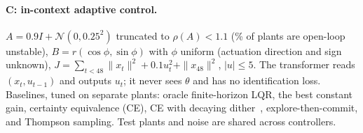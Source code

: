 \paragraph{C: in-context adaptive control.} $A=0.9I+\mathcal{N}(0,0.25^2)$ truncated to $\rho(A)<1.1$ (\CfracUnst\% of
plants are open-loop unstable), $B=r(\cos\phi,\sin\phi)$ with $\phi$ uniform (actuation direction and sign unknown),
$J=\sum_{t<48}\|x_t\|^2+0.1u_t^2+\|x_{48}\|^2$, $|u|\le5$. The transformer reads $(x_t,u_{t-1})$ and outputs $u_t$; it
never sees $\theta$ and has no identification loss. Baselines, tuned on separate plants: oracle finite-horizon LQR, the best
constant gain, certainty equivalence (CE), CE with decaying dither~\citep{simchowitz2020naive}, explore-then-commit, and
Thompson sampling. Test plants and noise are shared across controllers.
